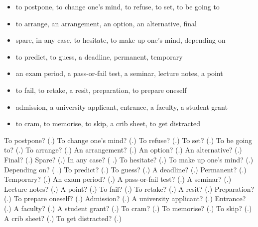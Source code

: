 \begin{itemize}
\raggedright
  \item to postpone, to change one’s mind, to refuse, to set, to be going to
  \item to arrange, an arrangement, an option, an alternative, final
  \item spare, in any case, to hesitate, to make up one’s mind, depending on
  \item to predict, to guess, a deadline, permanent, temporary
  \item an exam period, a pass-or-fail test, a seminar, lecture notes, a point
  \item to fail, to retake, a resit, preparation, to prepare oneself
  \item admission, a university applicant, entrance, a faculty, a student grant
  \item to cram, to memorise, to skip, a crib sheet, to get distracted
\end{itemize}

\begin{tcolorbox}[breakable,colback=teal!4,colframe=teal!35!black,title={Before you move on}]
To postpone? (\textbf{}.) To change one’s mind? (\textbf{}.) To refuse? (\textbf{}.) To set? (\textbf{}.) To be going to? (\textbf{}.) To arrange? (\textbf{}.) An arrangement? (\textbf{}.) An option? (\textbf{}.) An alternative? (\textbf{}.) Final? (\textbf{}.) Spare? (\textbf{}.) In any case? (\textbf{  }.) To hesitate? (\textbf{}.) To make up one’s mind? (\textbf{}.) Depending on? (\textbf{  }.) To predict? (\textbf{}.) To guess? (\textbf{}.) A deadline? (\textbf{}.) Permanent? (\textbf{}.) Temporary? (\textbf{}.) An exam period? (\textbf{}.) A pass-or-fail test? (\textbf{}.) A seminar? (\textbf{}.) Lecture notes? (\textbf{}.) A point? (\textbf{}.) To fail? (\textbf{}.) To retake? (\textbf{}.) A resit? (\textbf{}.) Preparation? (\textbf{}.) To prepare oneself? (\textbf{}.) Admission? (\textbf{}.) A university applicant? (\textbf{}.) Entrance? (\textbf{}.) A faculty? (\textbf{}.) A student grant? (\textbf{}.) To cram? (\textbf{}.) To memorise? (\textbf{}.) To skip? (\textbf{}.) A crib sheet? (\textbf{}.) To get distracted? (\textbf{}.)
\end{tcolorbox}
